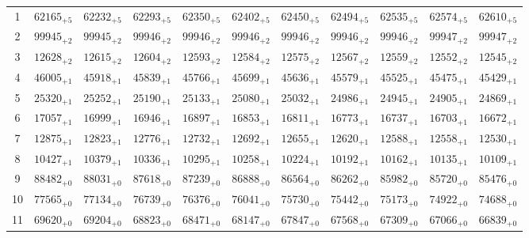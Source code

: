\documentclass[10pt, a4paper]{article}
\begin{document}
\begin{center}
\begin{tabular}{c || c c c c c | c c c c c}
        1 & \({62165}_{+5}\) & \({62232}_{+5}\) & \({62293}_{+5}\) & \({62350}_{+5}\) & \({62402}_{+5}\) & \({62450}_{+5}\) & \({62494}_{+5}\) & \({62535}_{+5}\) & \({62574}_{+5}\) & \({62610}_{+5}\)\\
        2 & \({99945}_{+2}\) & \({99945}_{+2}\) & \({99946}_{+2}\) & \({99946}_{+2}\) & \({99946}_{+2}\) & \({99946}_{+2}\) & \({99946}_{+2}\) & \({99946}_{+2}\) & \({99947}_{+2}\) & \({99947}_{+2}\)\\
        3 & \({12628}_{+2}\) & \({12615}_{+2}\) & \({12604}_{+2}\) & \({12593}_{+2}\) & \({12584}_{+2}\) & \({12575}_{+2}\) & \({12567}_{+2}\) & \({12559}_{+2}\) & \({12552}_{+2}\) & \({12545}_{+2}\)\\
        4 & \({46005}_{+1}\) & \({45918}_{+1}\) & \({45839}_{+1}\) & \({45766}_{+1}\) & \({45699}_{+1}\) & \({45636}_{+1}\) & \({45579}_{+1}\) & \({45525}_{+1}\) & \({45475}_{+1}\) & \({45429}_{+1}\)\\
        5 & \({25320}_{+1}\) & \({25252}_{+1}\) & \({25190}_{+1}\) & \({25133}_{+1}\) & \({25080}_{+1}\) & \({25032}_{+1}\) & \({24986}_{+1}\) & \({24945}_{+1}\) & \({24905}_{+1}\) & \({24869}_{+1}\)\\
        \hline
        6 & \({17057}_{+1}\) & \({16999}_{+1}\) & \({16946}_{+1}\) & \({16897}_{+1}\) & \({16853}_{+1}\) & \({16811}_{+1}\) & \({16773}_{+1}\) & \({16737}_{+1}\) & \({16703}_{+1}\) & \({16672}_{+1}\)\\
        7 & \({12875}_{+1}\) & \({12823}_{+1}\) & \({12776}_{+1}\) & \({12732}_{+1}\) & \({12692}_{+1}\) & \({12655}_{+1}\) & \({12620}_{+1}\) & \({12588}_{+1}\) & \({12558}_{+1}\) & \({12530}_{+1}\)\\
        8 & \({10427}_{+1}\) & \({10379}_{+1}\) & \({10336}_{+1}\) & \({10295}_{+1}\) & \({10258}_{+1}\) & \({10224}_{+1}\) & \({10192}_{+1}\) & \({10162}_{+1}\) & \({10135}_{+1}\) & \({10109}_{+1}\)\\
        9 & \({88482}_{+0}\) & \({88031}_{+0}\) & \({87618}_{+0}\) & \({87239}_{+0}\) & \({86888}_{+0}\) & \({86564}_{+0}\) & \({86262}_{+0}\) & \({85982}_{+0}\) & \({85720}_{+0}\) & \({85476}_{+0}\)\\
        10 & \({77565}_{+0}\) & \({77134}_{+0}\) & \({76739}_{+0}\) & \({76376}_{+0}\) & \({76041}_{+0}\) & \({75730}_{+0}\) & \({75442}_{+0}\) & \({75173}_{+0}\) & \({74922}_{+0}\) & \({74688}_{+0}\)\\
        \hline
        11 & \({69620}_{+0}\) & \({69204}_{+0}\) & \({68823}_{+0}\) & \({68471}_{+0}\) & \({68147}_{+0}\) & \({67847}_{+0}\) & \({67568}_{+0}\) & \({67309}_{+0}\) & \({67066}_{+0}\) & \({66839}_{+0}\)\\

\end{tabular}
\end{center}
\end{document}
